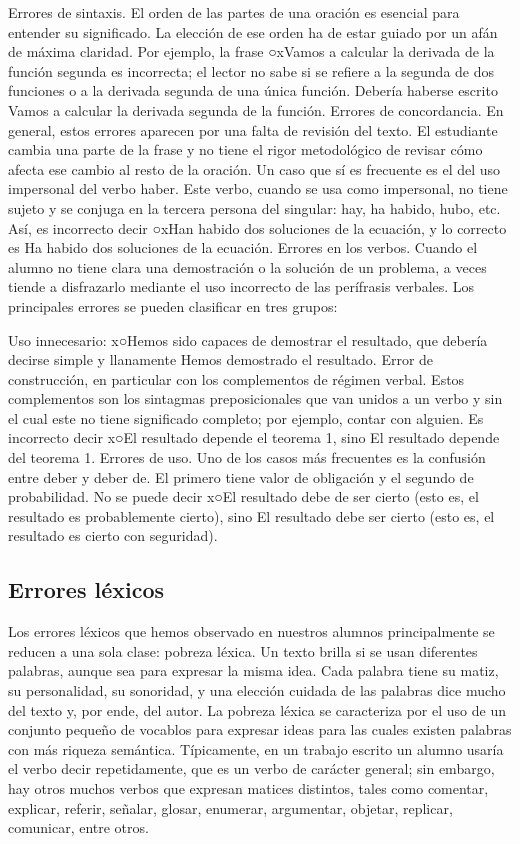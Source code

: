 Errores de sintaxis. El orden de las partes de una oración es esencial para entender su significado. La elección de ese orden ha de estar guiado por un afán de máxima claridad. Por ejemplo, la frase ○xVamos a calcular la derivada de la función segunda es incorrecta; el lector no sabe si se refiere a la segunda de dos funciones o a la derivada segunda de una única función. Debería haberse escrito Vamos a calcular la derivada segunda de la función.
Errores de concordancia. En general, estos errores aparecen por una falta de revisión del texto. El estudiante cambia una parte de la frase y no tiene el rigor metodológico de revisar cómo afecta ese cambio al resto de la oración. Un caso que sí es frecuente es el del uso impersonal del verbo haber. Este verbo, cuando se usa como impersonal, no tiene sujeto y se conjuga en la tercera persona del singular: hay, ha habido, hubo, etc. Así, es incorrecto decir ○xHan habido dos soluciones de la ecuación, y lo correcto es Ha habido dos soluciones de la ecuación.
Errores en los verbos. Cuando el alumno no tiene clara una demostración o la solución de un problema, a veces tiende a disfrazarlo mediante el uso incorrecto de las perífrasis verbales. Los principales errores se pueden clasificar en tres grupos:

Uso innecesario: x○Hemos sido capaces de demostrar el resultado, que debería decirse simple y llanamente Hemos demostrado el resultado.
Error de construcción, en particular con los complementos de régimen verbal. Estos complementos son los sintagmas preposicionales que van unidos a un verbo y sin el cual este no tiene significado completo; por ejemplo, contar con alguien. Es incorrecto decir x○El resultado depende el teorema 1, sino El resultado depende del teorema 1.
Errores de uso. Uno de los casos más frecuentes es la confusión entre deber y deber de. El primero tiene valor de obligación y el segundo de probabilidad. No se puede decir x○El resultado debe de ser cierto (esto es, el resultado es probablemente cierto), sino El resultado debe ser cierto (esto es, el resultado es cierto con seguridad).


\subsection{Errores léxicos}
Los errores léxicos que hemos observado en nuestros alumnos principalmente se reducen a una sola clase: pobreza léxica. Un texto brilla si se usan diferentes palabras, aunque sea para expresar la misma idea. Cada palabra tiene su matiz, su personalidad, su sonoridad, y una elección cuidada de las palabras dice mucho del texto y, por ende, del autor. La pobreza léxica se caracteriza por el uso de un conjunto pequeño de vocablos para expresar ideas para las cuales existen palabras con más riqueza semántica. Típicamente, en un trabajo escrito un alumno usaría el verbo decir repetidamente, que es un verbo de carácter general; sin embargo, hay otros muchos verbos que expresan matices distintos, tales como comentar, explicar, referir, señalar, glosar, enumerar, argumentar, objetar, replicar, comunicar, entre otros.